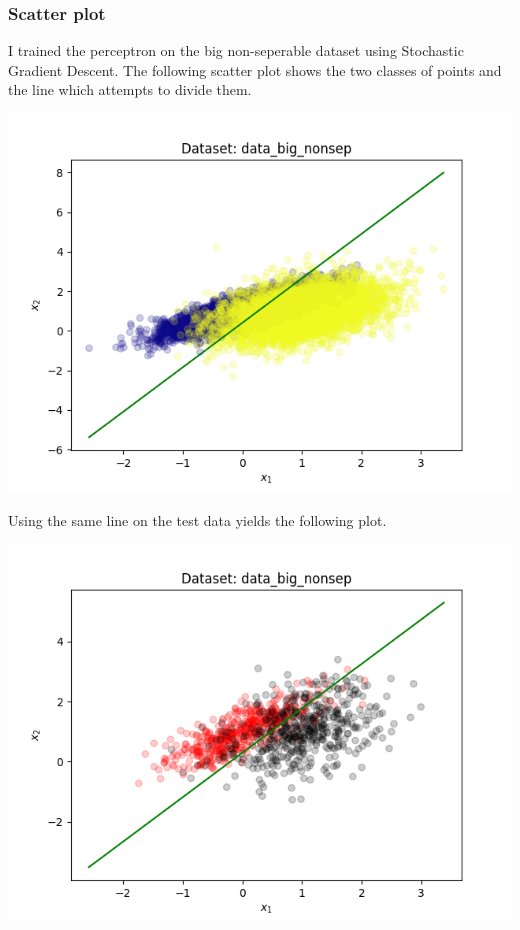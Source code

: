 \documentclass{article}
\begin{document}
\subsubsection{Scatter plot}
I trained the perceptron on the big non-seperable dataset using Stochastic Gradient Descent. The following scatter plot shows the two classes of points and the line which attempts to divide them. 

\begin{centering}
\includegraphics[width=0.9\linewidth]{ex4_scatter_training.png}
\end{centering}

Using the same line on the test data yields the following plot.

\begin{centering}
\includegraphics[width=0.9\linewidth]{ex4_scatter_test.png}
\end{centering}
\end{document}
